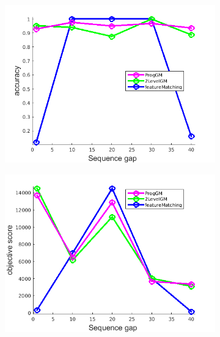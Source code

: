 \documentclass[
	fontsize=12pt,
	paper=a4,
	twoside=false,
	numbers=noenddot,
	plainheadsepline,
	toc=listof,
	toc=bibliography
]{scrartcl}
\begin{document}
\begin{figure}[h] 
	\begin{subfigure}[b]{0.3\textwidth}
		\centering
		\includegraphics[scale=0.25]{"fig_ver2608/RealImages/ImgTrafo/no_descr/using_ransac_afftrafo/performance/accuracy"} 
	\end{subfigure}%
	\begin{subfigure}[b]{0.3\textwidth}
		\centering
		\includegraphics[scale=0.25]{"fig_ver2608/RealImages/ImgTrafo/no_descr/using_ransac_afftrafo/performance/score"}   
	\end{subfigure} 
	\begin{subfigure}[b]{0.3\textwidth}
		\centering

\end{subfigure}
\end{figure}
\end{document}
